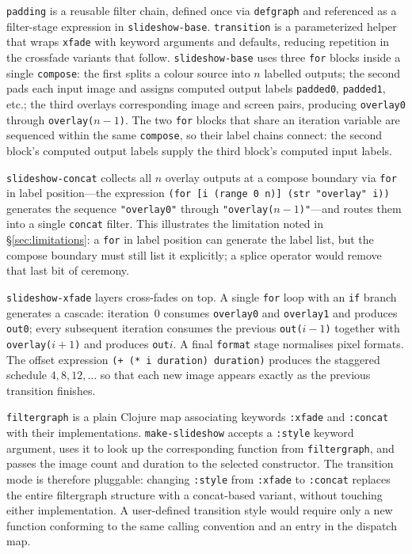 \documentclass[english,submission]{programming}
\begin{document}
\texttt{padding} is a reusable filter chain, defined once via \texttt{defgraph} and referenced as a filter-stage expression in \texttt{slideshow-base}. \texttt{transition} is a parameterized helper that wraps \texttt{xfade} with keyword arguments and defaults, reducing repetition in the crossfade variants that follow. \texttt{slideshow-base} uses three \texttt{for} blocks inside a single \texttt{compose}: the first splits a colour source into $n$ labelled outputs; the second pads each input image and assigns computed output labels \texttt{padded0}, \texttt{padded1}, etc.; the third overlays corresponding image and screen pairs, producing \texttt{overlay0} through \texttt{overlay($n{-}1$)}. The two \texttt{for} blocks that share an iteration variable are sequenced within the same \texttt{compose}, so their label chains connect: the second block's computed output labels supply the third block's computed input labels.

\texttt{slideshow-concat} collects all $n$ overlay outputs at a compose boundary via \texttt{for} in label position---the expression \texttt{(for [i (range 0 n)] (str "overlay" i))} generates the sequence \texttt{"overlay0"} through \texttt{"overlay($n{-}1$)"}---and routes them into a single \texttt{concat} filter. This illustrates the limitation noted in \S\ref{sec:limitations}: a \texttt{for} in label position can generate the label list, but the compose boundary must still list it explicitly; a splice operator would remove that last bit of ceremony.

\texttt{slideshow-xfade} layers cross-fades on top. A single \texttt{for} loop with an \texttt{if} branch generates a cascade: iteration~0 consumes \texttt{overlay0} and \texttt{overlay1} and produces \texttt{out0}; every subsequent iteration consumes the previous \texttt{out($i{-}1$)} together with \texttt{overlay($i{+}1$)} and produces \texttt{out$i$}. A final \texttt{format} stage normalises pixel formats. The offset expression \texttt{(+ (* i duration) duration)} produces the staggered schedule $4, 8, 12, \ldots$ so that each new image appears exactly as the previous transition finishes.

\texttt{filtergraph} is a plain Clojure map associating keywords \texttt{:xfade} and \texttt{:concat} with their implementations. \texttt{make-slideshow} accepts a \texttt{:style} keyword argument, uses it to look up the corresponding function from \texttt{filtergraph}, and passes the image count and duration to the selected constructor. The transition mode is therefore pluggable: changing \texttt{:style} from \texttt{:xfade} to \texttt{:concat} replaces the entire filtergraph structure with a concat-based variant, without touching either implementation. A user-defined transition style would require only a new function conforming to the same calling convention and an entry in the dispatch map.
\end{document}
